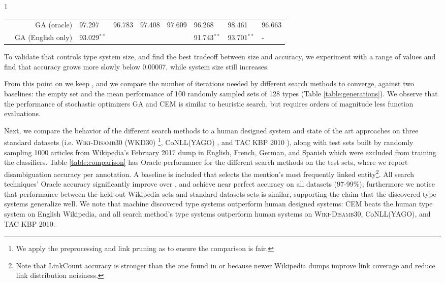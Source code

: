 \documentclass[letterpaper]{article}
\newcommand{\twoS}{\ensuremath{{}^{\textstyle **}}}
\begin{document}
\begin{table*}[ht]
\begin{center}
\begin{subtable}{1\linewidth}
\begin{center}
\begin{tabular}{ |c|r|l|l|l|l|l|l|l|}
& GA (oracle)                                        & 97.297  & 96.783 & 97.408 & 97.609 & 96.268 & 98.461 & 96.663\\
& GA (English only)                                  & 93.029\twoS & & & & 91.743\twoS & 93.701\twoS & - \\
\hline
\end{tabular}
\end{center}
\label{table:comparison}
    \end{subtable}
    \end{center}
\end{table*}


To validate that  controls type system size, and find the best tradeoff between size and accuracy, we experiment with a range of values and find that accuracy grows more slowly below 0.00007, while system size still increases.


From this point on we keep , and we compare the number of iterations needed by different search methods to converge, against two baselines: the empty set and the mean performance of 100 randomly sampled sets of 128 types (Table \ref{table:generations}). We observe that the performance of stochastic optimizers GA and CEM is similar to heuristic search, but requires orders of magnitude less function evaluations.

Next, we compare the behavior of the different search methods to a human designed system and state of the art approaches on three standard datasets (i.e. \textsc{Wiki-Disamb30} (WKD30) \cite{tagme}\footnote{We apply the preprocessing and link pruning as  \cite{tagme} to ensure the comparison is fair.}, CoNLL(YAGO) \cite{AIDA2011}, and TAC KBP 2010 \cite{ji2010overview}), along with test sets built by randomly sampling 1000 articles from Wikipedia's February 2017 dump in English, French, German, and Spanish which were excluded from training the classifiers. Table \ref{table:comparison} has Oracle performance for the different search methods on the test sets, where we report disambiguation accuracy per annotation. A  baseline is included that selects the mention's most frequently linked entity\footnote{Note that LinkCount accuracy is stronger than the one found in \cite{tagme} or \cite{milne2008learning} because newer Wikipedia dumps improve link coverage and reduce link distribution noisiness.}. All search techniques' Oracle accuracy significantly improve over , and achieve near perfect accuracy on all datasets (97-99\%); furthermore we notice that performance between the held-out Wikipedia sets and standard datasets sets is similar, supporting the claim that the discovered type systems generalize well. We note that machine discovered type systems outperform human designed systems: CEM beats the human type system on English Wikipedia, and all search method's type systems outperform human systems on \textsc{Wiki-Disamb30}, CoNLL(YAGO), and TAC KBP 2010.
\end{document}
